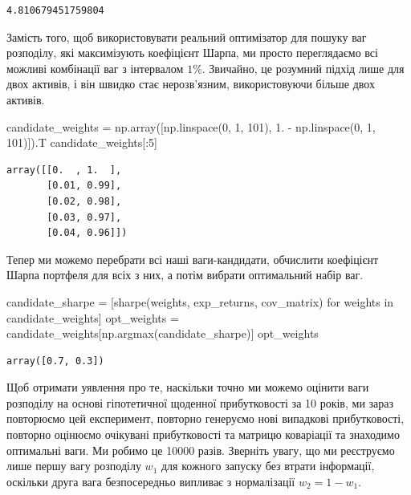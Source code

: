 \documentclass[
  letterpaper,
]{report}
\newenvironment{Shaded}{\begin{snugshade}}{\end{snugshade}}
\newcommand{\ControlFlowTok}[1]{\textcolor[rgb]{0.00,0.23,0.31}{#1}}
\newcommand{\DecValTok}[1]{\textcolor[rgb]{0.68,0.00,0.00}{#1}}
\newcommand{\FloatTok}[1]{\textcolor[rgb]{0.68,0.00,0.00}{#1}}
\newcommand{\KeywordTok}[1]{\textcolor[rgb]{0.00,0.23,0.31}{#1}}
\newcommand{\NormalTok}[1]{\textcolor[rgb]{0.00,0.23,0.31}{#1}}
\newcommand{\OperatorTok}[1]{\textcolor[rgb]{0.37,0.37,0.37}{#1}}
\begin{document}
\begin{verbatim}
4.810679451759804
\end{verbatim}

Замість того, щоб використовувати реальний оптимізатор для пошуку ваг
розподілу, які максимізують коефіцієнт Шарпа, ми просто переглядаємо всі
можливі комбінації ваг з інтервалом \(1\%\). Звичайно, це розумний
підхід лише для двох активів, і він швидко стає нерозв'язним,
використовуючи більше двох активів.

\begin{Shaded}
\begin{Highlighting}[]
\NormalTok{candidate\_weights }\OperatorTok{=}\NormalTok{ np.array([np.linspace(}\DecValTok{0}\NormalTok{, }\DecValTok{1}\NormalTok{, }\DecValTok{101}\NormalTok{), }\FloatTok{1.} \OperatorTok{{-}}\NormalTok{ np.linspace(}\DecValTok{0}\NormalTok{, }\DecValTok{1}\NormalTok{, }\DecValTok{101}\NormalTok{)]).T}
\NormalTok{candidate\_weights[:}\DecValTok{5}\NormalTok{]}
\end{Highlighting}
\end{Shaded}

\begin{verbatim}
array([[0.  , 1.  ],
       [0.01, 0.99],
       [0.02, 0.98],
       [0.03, 0.97],
       [0.04, 0.96]])
\end{verbatim}

Тепер ми можемо перебрати всі наші ваги-кандидати, обчислити коефіцієнт
Шарпа портфеля для всіх з них, а потім вибрати оптимальний набір ваг.

\begin{Shaded}
\begin{Highlighting}[]
\NormalTok{candidate\_sharpe }\OperatorTok{=}\NormalTok{ [sharpe(weights, exp\_returns, cov\_matrix) }\ControlFlowTok{for}\NormalTok{ weights }\KeywordTok{in}\NormalTok{ candidate\_weights]}
\NormalTok{opt\_weights }\OperatorTok{=}\NormalTok{ candidate\_weights[np.argmax(candidate\_sharpe)]}
\NormalTok{opt\_weights}
\end{Highlighting}
\end{Shaded}

\begin{verbatim}
array([0.7, 0.3])
\end{verbatim}

Щоб отримати уявлення про те, наскільки точно ми можемо оцінити ваги
розподілу на основі гіпотетичної щоденної прибутковості за 10 років, ми
зараз повторюємо цей експеримент, повторно генеруємо нові випадкові
прибутковості, повторно оцінюємо очікувані прибутковості та матрицю
коваріації та знаходимо оптимальні ваги. Ми робимо це 10000 разів.
Зверніть увагу, що ми реєструємо лише першу вагу розподілу \(w_1\) для
кожного запуску без втрати інформації, оскільки друга вага безпосередньо
випливає з нормалізації \(w_2 = 1 - w_1\).
\end{document}
